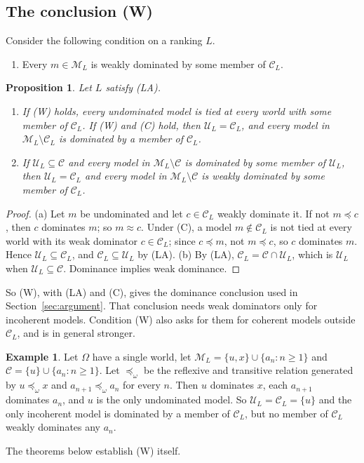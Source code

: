 \documentclass[11pt]{article}
\newtheorem{proposition}[theorem]{Proposition}
\theoremstyle{definition}
\newtheorem{example}[theorem]{Example}
\theoremstyle{remark}
\newcommand{\M}{\mathcal M}
\newcommand{\C}{\mathcal C}
\newcommand{\U}{\mathcal U}
\begin{document}
\subsection{The conclusion (W)}\label{sec:W}
Consider the following condition on a ranking $L$.
\begin{enumerate}[label=\textbf{(W)},leftmargin=*]
\item Every $m\in\M_L$ is weakly dominated by some member of $\C_L$.
\end{enumerate}
\begin{proposition}\label{prop:W}
Let $L$ satisfy (LA).
\begin{enumerate}[label=(\alph*)]
\item If (W) holds, every undominated model is tied at every world with some member of $\C_L$. If (W) and (C) hold, then $\U_L=\C_L$, and every model in $\M_L\setminus\C_L$ is dominated by a member of $\C_L$.
\item If $\U_L\subseteq\C$ and every model in $\M_L\setminus\C$ is dominated by some member of $\U_L$, then $\U_L=\C_L$ and every model in $\M_L\setminus\C$ is weakly dominated by some member of $\C_L$.
\end{enumerate}
\end{proposition}
\begin{proof}
(a) Let $m$ be undominated and let $c\in\C_L$ weakly dominate it. If not $m\preceq c$, then $c$ dominates $m$; so $m\approx c$. Under (C), a model $m\notin\C_L$ is not tied at every world with its weak dominator $c\in\C_L$; since $c\preceq m$, not $m\preceq c$, so $c$ dominates $m$. Hence $\U_L\subseteq\C_L$, and $\C_L\subseteq\U_L$ by (LA). (b) By (LA), $\C_L=\C\cap\U_L$, which is $\U_L$ when $\U_L\subseteq\C$. Dominance implies weak dominance.
\end{proof}
So (W), with (LA) and (C), gives the dominance conclusion used in Section~\ref{sec:argument}. That conclusion needs weak dominators only for incoherent models. Condition (W) also asks for them for coherent models outside $\C_L$, and is in general stronger.
\begin{example}\label{ex:W-strong}
Let $\Omega$ have a single world, let $\M_L=\{u,x\}\cup\{a_n:n\ge1\}$ and $\C=\{u\}\cup\{a_n:n\ge1\}$. Let $\preceq_\omega$ be the reflexive and transitive relation generated by $u\preceq_\omega x$ and $a_{n+1}\preceq_\omega a_n$ for every $n$. Then $u$ dominates $x$, each $a_{n+1}$ dominates $a_n$, and $u$ is the only undominated model. So $\U_L=\C_L=\{u\}$ and the only incoherent model is dominated by a member of $\C_L$, but no member of $\C_L$ weakly dominates any $a_n$.
\end{example}
The theorems below establish (W) itself.
\end{document}
